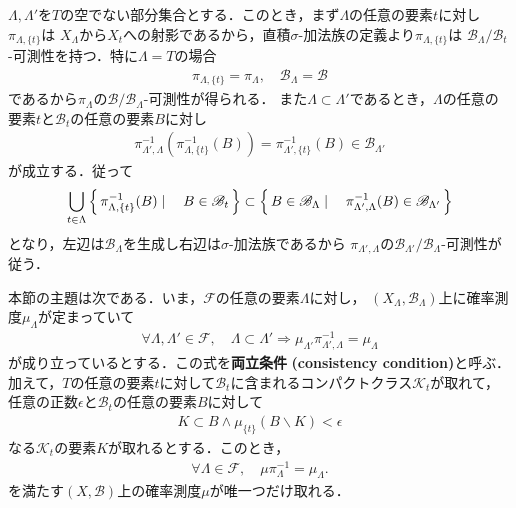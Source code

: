 	\begin{prf}
		$\Lambda,\Lambda'$を$T$の空でない部分集合とする．このとき，まず$\Lambda$の任意の要素$t$に対し$\pi_{\Lambda,\{t\}}$は
		$X_\Lambda$から$X_t$への射影であるから，直積$\sigma$-加法族の定義より$\pi_{\Lambda,\{t\}}$は
		$\mathscr{B}_\Lambda/\mathscr{B}_t$-可測性を持つ．特に$\Lambda=T$の場合
		\begin{align}
			\pi_{\Lambda,\{t\}} = \pi_\Lambda,\quad \mathscr{B}_\Lambda = \mathscr{B}
		\end{align}
		であるから$\pi_\Lambda$の$\mathscr{B}/\mathscr{B}_\Lambda$-可測性が得られる．
		また$\Lambda \subset \Lambda'$であるとき，$\Lambda$の任意の要素$t$と$\mathscr{B}_t$の任意の要素$B$に対し
		\begin{align}
			\pi_{\Lambda',\Lambda}^{-1}\left(\pi_{\Lambda,\{t\}}^{-1}(B)\right)
			= \pi_{\Lambda',\{t\}}^{-1}(B) \in \mathscr{B}_{\Lambda'}
		\end{align}
		が成立する．従って
		\begin{align}
			\bigcup_{t\in\Lambda} \left\{\, \pi_{\Lambda,\{t\}}^{-1}(B) \mid \quad B \in \mathscr{B}_t\, \right\}
			\subset \left\{\, B \in \mathscr{B}_\Lambda \mid \quad \pi_{\Lambda',\Lambda}^{-1}(B) \in \mathscr{B}_{\Lambda'}\, \right\}
		\end{align}
		となり，左辺は$\mathscr{B}_\Lambda$を生成し右辺は$\sigma$-加法族であるから
		$\pi_{\Lambda',\Lambda}$の$\mathscr{B}_{\Lambda'}/\mathscr{B}_\Lambda$-可測性が従う．
		\QED
	\end{prf}
	
	本節の主題は次である．いま，$\mathscr{F}$の任意の要素$\Lambda$に対し，
	$(X_\Lambda,\mathscr{B}_\Lambda)$上に確率測度$\mu_\Lambda$が定まっていて
	\begin{align}
		\forall \Lambda,\Lambda' \in \mathscr{F},\quad
		\Lambda \subset \Lambda' \Longrightarrow
		\mu_{\Lambda'} \pi_{\Lambda',\Lambda}^{-1}
		= \mu_\Lambda
	\end{align}
	が成り立っているとする．この式を{\bf 両立条件}
	{\bf (consistency condition)}と呼ぶ．
	加えて，$T$の任意の要素$t$に対して$\mathscr{B}_t$に含まれるコンパクトクラス$\mathcal{K}_t$が取れて，
	任意の正数$\epsilon$と$\mathscr{B}_t$の任意の要素$B$に対して
	\begin{align}
		K \subset B \wedge \mu_{\{t\}}(B \backslash K) < \epsilon
	\end{align}
	なる$\mathcal{K}_t$の要素$K$が取れるとする．このとき，
	\begin{align}
		\forall \Lambda \in \mathscr{F},\quad 
		\mu \pi_{\Lambda}^{-1} = \mu_\Lambda.
	\end{align}
	を満たす$(X,\mathscr{B})$上の確率測度$\mu$が唯一つだけ取れる．
	
